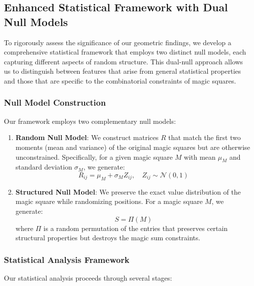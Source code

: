 \subsection{Enhanced Statistical Framework with Dual Null Models}
\label{subsec:null_models}

To rigorously assess the significance of our geometric findings, we develop a comprehensive statistical framework that employs two distinct null models, each capturing different aspects of random structure. This dual-null approach allows us to distinguish between features that arise from general statistical properties and those that are specific to the combinatorial constraints of magic squares.

\subsubsection{Null Model Construction}

Our framework employs two complementary null models:

\begin{enumerate}
    \item \textbf{Random Null Model}: We construct matrices $R$ that match the first two moments (mean and variance) of the original magic squares but are otherwise unconstrained. Specifically, for a given magic square $M$ with mean $\mu_M$ and standard deviation $\sigma_M$, we generate:
    \[
    R_{ij} = \mu_M + \sigma_M Z_{ij}, \quad Z_{ij} \sim \mathcal{N}(0,1)
    \]
    
    \item \textbf{Structured Null Model}: We preserve the exact value distribution of the magic square while randomizing positions. For a magic square $M$, we generate:
    \[
    S = \Pi(M)
    \]
    where $\Pi$ is a random permutation of the entries that preserves certain structural properties but destroys the magic sum constraints.
\end{enumerate}

\subsubsection{Statistical Analysis Framework}

Our statistical analysis proceeds through several stages:

